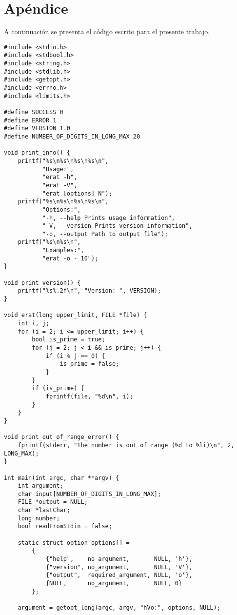 \documentclass[a4paper,10pt]{article}
\begin{document}
\section{Apéndice}
A continuación se presenta el código escrito para el presente trabajo.\\
  \begin{verbatim}
#include <stdio.h>
#include <stdbool.h>
#include <string.h>
#include <stdlib.h>
#include <getopt.h>
#include <errno.h>
#include <limits.h>

#define SUCCESS 0
#define ERROR 1
#define VERSION 1.0
#define NUMBER_OF_DIGITS_IN_LONG_MAX 20

void print_info() {
    printf("%s\n%s\n%s\n%s\n",
           "Usage:",
           "erat -h",
           "erat -V",
           "erat [options] N");
    printf("%s\n%s\n%s\n%s\n",
           "Options:",
           "-h, --help Prints usage information",
           "-V, --version Prints version information",
           "-o, --output Path to output file");
    printf("%s\n%s\n",
           "Examples:",
           "erat -o - 10");
}

void print_version() {
    printf("%s%.2f\n", "Version: ", VERSION);
}

void erat(long upper_limit, FILE *file) {
    int i, j;
    for (i = 2; i <= upper_limit; i++) {
        bool is_prime = true;
        for (j = 2; j < i && is_prime; j++) {
            if (i % j == 0) {
                is_prime = false;
            }
        }
        if (is_prime) {
            fprintf(file, "%d\n", i);
        }
    }
}

void print_out_of_range_error() {
    fprintf(stderr, "The number is out of range (%d to %li)\n", 2, LONG_MAX);
}

int main(int argc, char **argv) {
    int argument;
    char input[NUMBER_OF_DIGITS_IN_LONG_MAX];
    FILE *output = NULL;
    char *lastChar;
    long number;
    bool readFromStdin = false;

    static struct option options[] =
        {
            {"help",    no_argument,       NULL, 'h'},
            {"version", no_argument,       NULL, 'V'},
            {"output",  required_argument, NULL, 'o'},
            {NULL,      no_argument,       NULL, 0}
        };

    argument = getopt_long(argc, argv, "hVo:", options, NULL);


\end{verbatim}
\end{document}

